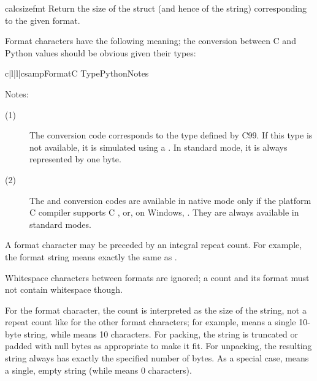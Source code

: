 \begin{funcdesc}{calcsize}{fmt}
  Return the size of the struct (and hence of the string)
  corresponding to the given format.
\end{funcdesc}

Format characters have the following meaning; the conversion between
C and Python values should be obvious given their types:

\begin{tableiv}{c|l|l|c}{samp}{Format}{C Type}{Python}{Notes}
\end{tableiv}

\noindent
Notes:

\begin{description}
\item[(1)]
  The  conversion code corresponds to the  type
  defined by C99. If this type is not available, it is simulated using a
  . In standard mode, it is always represented by one byte.
\item[(2)]
  The  and  conversion codes are available in
  native mode only if the platform C compiler supports C ,
  or, on Windows, .  They are always available in standard
  modes.
\end{description}


A format character may be preceded by an integral repeat count.  For
example, the format string  means exactly the same as
.

Whitespace characters between formats are ignored; a count and its
format must not contain whitespace though.

For the  format character, the count is interpreted as the
size of the string, not a repeat count like for the other format
characters; for example,  means a single 10-byte string, while
 means 10 characters.  For packing, the string is
truncated or padded with null bytes as appropriate to make it fit.
For unpacking, the resulting string always has exactly the specified
number of bytes.  As a special case,  means a single, empty
string (while  means 0 characters).

